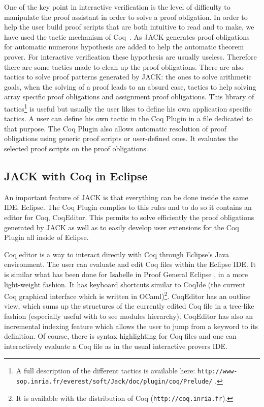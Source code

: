 One of the key point in interactive verification is the level of difficulty
to manipulate the proof assistant in order to solve a proof obligation.
In order to help the user build proof scripts that are both intuitive
to read and to make, we have used the tactic mechanism of Coq~\cite{DEL-00-LTAC}.
As JACK generates proof obligations for automatic numerous hypothesis are 
added to help the automatic theorem prover. For interactive verification 
these hypothesis are usually useless. Therefore there are some tactics made
to clean up the proof obligations. There are also tactics to solve proof patterns
generated by JACK: the ones to solve arithmetic goals,
when the solving of a proof leads to an absurd case, tactics to help solving
array specific proof obligations and assignment proof obligations.
This library of tactics\footnote{
A full description of the different tactics is available here:
\texttt{http://www-sop.inria.fr/everest/soft/Jack/doc/plugin/coq/Prelude/} .}
is useful but usually the user likes to define his own application
specific tactics. A user can define his own tactic in the Coq Plugin in a file 
dedicated to that purpose.
The Coq Plugin also allows automatic resolution of proof obligations
using generic proof scripts or user-defined ones.
It evaluates the selected proof scripts on the proof obligations.






\subsection{JACK with Coq in Eclipse}
An important feature of JACK is that everything can be done inside the same IDE, Eclipse.
The Coq Plugin complies to this rules and to do so it contains an editor for Coq, 
CoqEditor. This permits to solve efficiently the proof obligations generated by JACK as
well as to easily develop user extensions for the Coq Plugin all inside of Eclipse.

Coq editor is a way to interact directly with Coq through Eclipse's Java 
environment. The user can evaluate and edit Coq files within the
Eclipse IDE. It is similar what has been done for Isabelle in 
Proof General Eclipse \cite{WintersteinAL05}, in a more light-weight fashion.
It has keyboard shortcuts similar to CoqIde (the current Coq graphical
interface which is written in OCaml)\footnote{It is available with the
distribution of Coq (\texttt{http://coq.inria.fr}).}. 
CoqEditor has an outline view,
which sums up the structures of the currently edited Coq file 
in a tree-like fashion (especially useful with to see modules hierarchy). 
CoqEditor has also an incremental indexing feature which allows the user
to jump from a keyword to its definition.
Of course, there is syntax highlighting for Coq files 
and one can interactively evaluate a Coq file
as in the usual interactive provers IDE.


